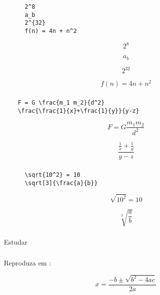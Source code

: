 \begin{frame}[fragile]
  \frametitle{}
  \Large

  \begin{minipage}{.65\textwidth}
    \begin{verbatim}
      2^8
      a_b
      2^{32}
      f(n) = 4n + n^2
    \end{verbatim}
  \end{minipage}
  \begin{minipage}{.25\textwidth}
    \[ 2^8 \]

    \[ a_b \]

    \[ 2^{32} \]

    \[ f(n) = 4n + n^2 \]
  \end{minipage}
\end{frame}

\begin{frame}[fragile]
  \frametitle{}
  \Large
  \begin{verbatim}
    F = G \frac{m_1 m_2}{d^2}
    \frac{\frac{1}{x}+\frac{1}{y}}{y-z}
  \end{verbatim}

  \[ F = G \frac{m_1 m_2}{d^2} \]

  \[ \frac{\frac{1}{x}+\frac{1}{y}}{y-z} \]
\end{frame}

\begin{frame}[fragile]
  \frametitle{}
  \Large
  \begin{minipage}{.55\textwidth}
    \begin{verbatim}
      \sqrt{10^2} = 10
      \sqrt[3]{\frac{a}{b}}
    \end{verbatim}
  \end{minipage}
  \begin{minipage}{.35\textwidth}
    \[ \sqrt{10^2} = 10 \]

    \[ \sqrt[3]{\frac{a}{b}} \]
  \end{minipage}
\end{frame}

\begin{frame}
  \frametitle{}
  \Huge
  Estudar 
\end{frame}

\begin{frame}
  \frametitle{}
  \Large
  Reproduza em :

  \huge
  \begin{equation}
    x = \frac{-b \pm \sqrt{b^2 - 4ac}}{2a}
  \end{equation}
\end{frame}
